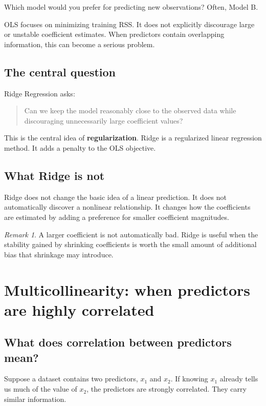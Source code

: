 \documentclass[11pt,a4paper]{article}
\numberwithin{equation}{section}
\theoremstyle{remark}
\newtheorem{remark}{Remark}[section]
\begin{document}
Which model would you prefer for predicting new observations? Often, Model B.

OLS focuses on minimizing training RSS. It does not explicitly discourage
large or unstable coefficient estimates. When predictors contain overlapping
information, this can become a serious problem.

\subsection{The central question}
Ridge Regression asks:

\begin{quote}
Can we keep the model reasonably close to the observed data while discouraging
unnecessarily large coefficient values?
\end{quote}

This is the central idea of \textbf{regularization}. Ridge is a regularized
linear regression method. It adds a penalty to the OLS objective.

\subsection{What Ridge is not}
Ridge does not change the basic idea of a linear prediction. It does not
automatically discover a nonlinear relationship. It changes how the
coefficients are estimated by adding a preference for smaller coefficient
magnitudes.

\begin{remark}
A larger coefficient is not automatically bad. Ridge is useful when the
stability gained by shrinking coefficients is worth the small amount of
additional bias that shrinkage may introduce.
\end{remark}

\section{Multicollinearity: when predictors are highly correlated}

\subsection{What does correlation between predictors mean?}
Suppose a dataset contains two predictors, $x_1$ and $x_2$. If knowing $x_1$
already tells us much of the value of $x_2$, the predictors are strongly
correlated. They carry similar information.
\end{document}
